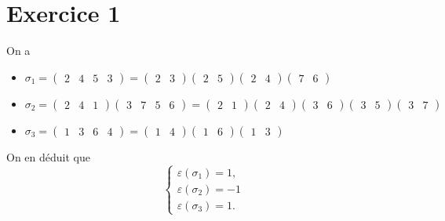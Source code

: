 \part{Exercice 1}

On a
\begin{itemize}
	\item $\sigma_1 = \begin{pmatrix}
			2&4&5&3
		\end{pmatrix} = \begin{pmatrix}
			2&3
		\end{pmatrix} \begin{pmatrix}
			2&5
		\end{pmatrix} \begin{pmatrix}
			2&4
		\end{pmatrix} \begin{pmatrix}
			7&6
		\end{pmatrix}$
	\item $\sigma_2 = \begin{pmatrix}
			2&4&1
		\end{pmatrix} \begin{pmatrix}
			3&7&5&6
		\end{pmatrix} = \begin{pmatrix}
			2&1
		\end{pmatrix} \begin{pmatrix}
			2&4
		\end{pmatrix} \begin{pmatrix}
			3&6
		\end{pmatrix} \begin{pmatrix}
			3&5
		\end{pmatrix} \begin{pmatrix}
			3&7
		\end{pmatrix}$
	\item $\sigma_3 = \begin{pmatrix}
			1&3&6&4
		\end{pmatrix} = \begin{pmatrix}
			1&4
		\end{pmatrix} \begin{pmatrix}
			1&6
		\end{pmatrix} \begin{pmatrix}
			1&3
		\end{pmatrix}$
\end{itemize}

On en déduit que \[
	\begin{cases}
		\varepsilon(\sigma_1) = 1,\\
		\varepsilon(\sigma_2) = -1\\
		\varepsilon(\sigma_3) = 1.
	\end{cases}
\]
